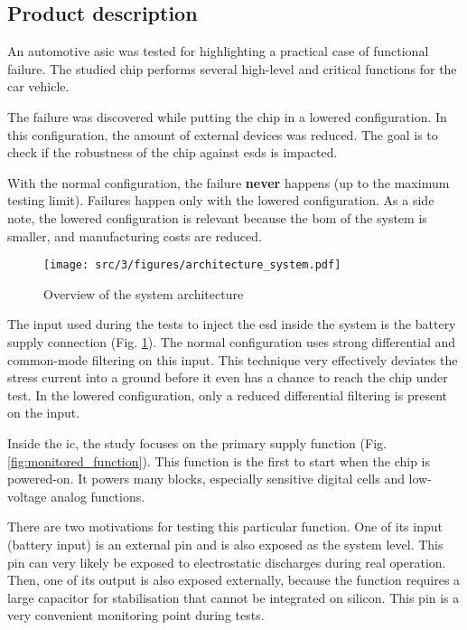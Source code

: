 \subsection{Product description}
\label{sec:product-desc}

An automotive \gls{asic} was tested for highlighting a practical case of functional failure.
The studied chip performs several high-level and critical functions for the car vehicle.

The failure was discovered while putting the chip in a lowered configuration.
In this configuration, the amount of external devices was reduced.
The goal is to check if the robustness of the chip against \gls{esd}s is impacted.

With the normal configuration, the failure \textbf{never} happens (up to the maximum testing limit).
Failures happen only with the lowered configuration.
As a side note, the lowered configuration is relevant because the \gls{bom} of the system is smaller, and manufacturing costs are reduced.

\begin{figure}[!h]
  \centering
  \texttt{[image: src/3/figures/architecture\_system.pdf]}
  \caption{Overview of the system architecture}
  \label{fig:system_architecture}
\end{figure}

The input used during the tests to inject the \gls{esd} inside the system is the battery supply connection (Fig. \ref{fig:system_architecture}).
The normal configuration uses strong differential and common-mode filtering on this input.
This technique very effectively deviates the stress current into a ground before it even has a chance to reach the chip under test.
In the lowered configuration, only a reduced differential filtering is present on the input.

Inside the \gls{ic}, the study focuses on the primary supply function (Fig. \ref{fig:monitored_function}).
This function is the first to start when the chip is powered-on.
It powers many blocks, especially sensitive digital cells and low-voltage analog functions.

There are two motivations for testing this particular function.
One of its input (battery input) is an external pin and is also exposed as the system level.
This pin can very likely be exposed to electrostatic discharges during real operation.
Then, one of its output is also exposed externally, because the function requires a large capacitor for stabilisation that cannot be integrated on silicon.
This pin is a very convenient monitoring point during tests.

